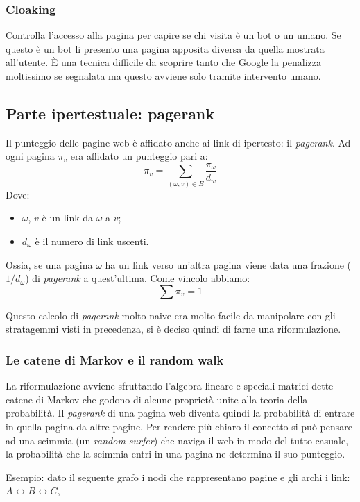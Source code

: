 			\subsubsection{Cloaking}
				Controlla l'accesso alla pagina per capire se chi visita è un bot o un umano. Se questo è un bot li presento una pagina apposita diversa da quella mostrata all'utente. È una tecnica difficile da scoprire tanto che Google la penalizza moltissimo se segnalata ma questo avviene solo tramite intervento umano.
			
	
		\subsection{Parte ipertestuale: pagerank}
			Il punteggio delle pagine web è affidato anche ai link di ipertesto: il \emph{pagerank}. Ad ogni pagina $\pi_v$ era affidato un punteggio pari a:
				\[
					\pi_v=\sum_{(\omega, v) \in E}\frac{\pi_{\omega}}{d_w}
				\]
			Dove:
			\begin{itemize}
				\item $\omega$, $v$ è un link da $\omega$ a $v$;
				\item $d_\omega$ è il numero di link uscenti.
			\end{itemize}
			Ossia, se una pagina $\omega$ ha un link verso un'altra pagina viene data una frazione ($1/d_\omega$) di \emph{pagerank} a quest'ultima.
			Come vincolo abbiamo:
			\[
				\sum\pi_v=1
			\]
			
			Questo calcolo di \emph{pagerank} molto naive era molto facile da manipolare con gli stratagemmi visti in precedenza, si è deciso quindi di farne una riformulazione.
		
			\subsubsection{Le catene di Markov e il random walk}
				La riformulazione avviene sfruttando l'algebra lineare e speciali matrici dette catene di Markov che godono di alcune proprietà unite alla teoria della probabilità. Il \emph{pagerank} di una pagina web diventa quindi la probabilità di entrare in quella pagina da altre pagine.
				Per rendere più chiaro il concetto si può pensare ad una scimmia  (un \emph{random surfer}) che naviga il web in modo del tutto casuale, la probabilità che la scimmia entri in una pagina ne determina il suo punteggio.
				
				Esempio:
					dato il seguente grafo i nodi che rappresentano pagine e gli archi i link:
					$A \longleftrightarrow B \longleftrightarrow C$,
					
